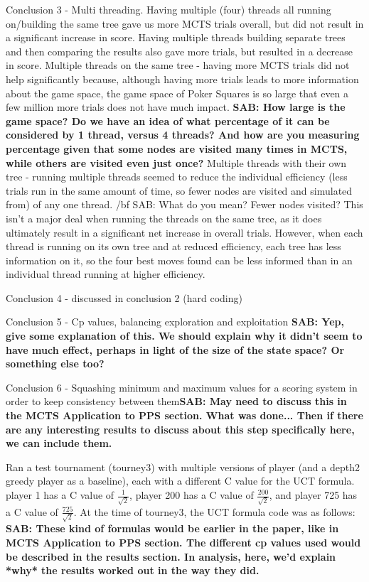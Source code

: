 \documentclass[letterpaper]{article}
\begin{document}
Conclusion 3 - Multi threading. Having multiple (four) threads all running on/building the same tree gave us more MCTS trials overall, but did not result in a significant increase in score. Having multiple threads building separate trees and then comparing the results also gave more trials, but resulted in a decrease in score.
	Multiple threads on the same tree - having more MCTS trials did not help significantly because, although having more trials leads to more information about the game space, the game space of Poker Squares is so large that even a few million more trials does not have much impact. {\bf SAB: How large is the game space? Do we have an idea of what percentage of it can be considered by 1 thread, versus 4 threads? And how are you measuring percentage given that some nodes are visited many times in MCTS, while others are visited even just once?}
	Multiple threads with their own tree - running multiple threads seemed to reduce the individual efficiency  (less trials run in the same amount of time, so fewer nodes are visited and simulated from) of any one thread. {/bf SAB: What do you mean? Fewer nodes visited?} This isn't a major deal when running the threads on the same tree, as it does ultimately result in a significant net increase in overall trials. However, when each thread is running on its own tree and at reduced efficiency, each tree has less information on it, so the four best moves found can be less informed than in an individual thread running at higher efficiency. 

Conclusion 4 - discussed in conclusion 2 (hard coding)

Conclusion 5 - Cp values, balancing exploration and exploitation {\bf SAB: Yep, give some explanation of this. We should explain why it didn't seem to have much effect, perhaps in light of the size of the state space? Or something else too?}

Conclusion 6 - Squashing minimum and maximum values for a scoring system in order to keep consistency between them{\bf SAB: May need to discuss this in the MCTS Application to PPS section. What was done... Then if there are any interesting results to discuss about this step specifically here, we can include them.}

Ran a test tournament (tourney3) with multiple versions of player (and a depth2 greedy player as a baseline), each with a different C value for the UCT formula. player 1 has a C value of $\frac{1}{\sqrt{2}}$, player 200 has a C value of $\frac{200}{\sqrt{2}}$, and player 725 has a C value of $\frac{725}{\sqrt{2}}$. At the time of tourney3, the UCT formula code was as follows: 
{\bf SAB: These kind of formulas would be earlier in the paper, like in MCTS Application to PPS section. The different cp values used would be described in the results section. In analysis, here, we'd explain *why* the results worked out in the way they did.}
\end{document}
